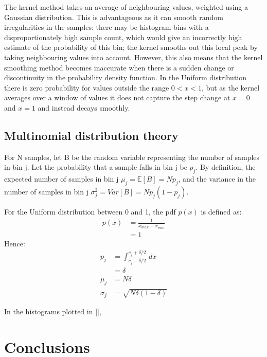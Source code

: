 \documentclass[a4paper]{article}
\begin{document}
The kernel method takes an average of neighbouring values, weighted using a Gaussian distribution. This is advantageous
as it can smooth random irregularities in the samples: there may be histogram bins with a disproportionately high sample
count, which would give an incorrectly high estimate of the probability of this bin; the kernel smooths out this local
peak by taking neighbouring values into account. However, this also means that the kernel smoothing method becomes
inaccurate when there is a sudden change or discontinuity in the probability density function. In the Uniform
distribution there is zero probability for values outside the range $0<x<1$, but as the kernel averages over a window of
values it does not capture the step change at $x=0$ and $x=1$ and instead decays smoothly.


\subsection{Multinomial distribution theory}

For N samples, let B be the random variable representing the number of samples in bin j. Let the probability that a
sample falls in bin j be $p_j$. By definition, the expected number of samples in bin j $\mu_j = \mathbb{E}[B] = N p_j$,
and the variance in the number of samples in bin j $\sigma^2_j = Var[B] = N p_j (1 - p_j)$.

For the Uniform distribution between 0 and 1, the pdf $p(x)$ is defined as:
\begin{align*}
    p(x) &= \frac{1}{x_{max} - x_{min}} \\
         &= 1
\end{align*}
Hence:
\begin{align*}
    p_j &= \int_{c_j - \delta/2}^{c_j + \delta/2}\,dx \\
        &= \delta \\
    \mu_j &= N \delta \\
    \sigma_j &= \sqrt{N \delta (1 - \delta)}
\end{align*}

In the histograms plotted in \autoref{},




\section{Conclusions}
\label{sec:conclusions}




\end{document}
